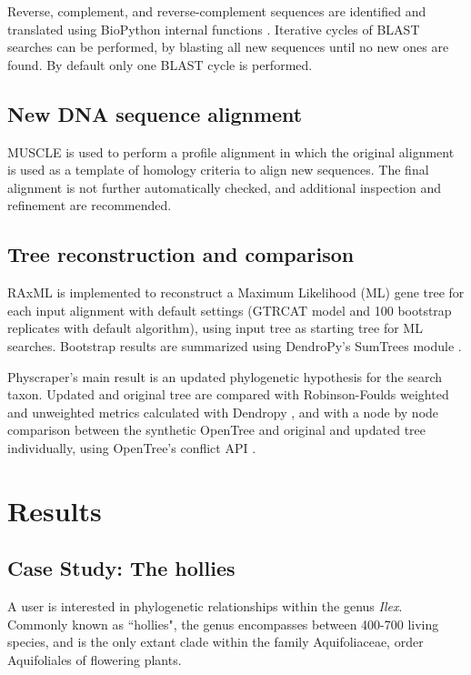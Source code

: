 \documentclass{bmcart}
\begin{document}
Reverse, complement, and reverse-complement sequences are identified and translated
using BioPython internal functions \cite{cock2009biopython}.
Iterative cycles of BLAST searches can be performed, by blasting all new sequences
until no new ones are found. By default only one BLAST cycle is performed.

\subsection*{New DNA sequence alignment}

MUSCLE \cite{edgar2004muscle} is used to perform a profile alignment in which the
original alignment is used as a template of homology criteria to align new sequences.
The final alignment is not further automatically checked, and additional inspection
and refinement are recommended.

\subsection*{Tree reconstruction and comparison}

RAxML \cite{stamatakis2014raxml} is implemented to reconstruct a Maximum Likelihood
(ML) gene tree for each input alignment with default settings (GTRCAT model and
100 bootstrap replicates with default algorithm), using input tree as starting
tree for ML searches.
Bootstrap results are summarized using DendroPy's SumTrees module
\cite{sukumaran2010dendropy}.

Physcraper's main result is an updated phylogenetic hypothesis for the search taxon.
Updated and original tree are compared with Robinson-Foulds weighted and unweighted
metrics calculated with Dendropy \cite{sukumaran2010dendropy}, and with a node by node
comparison between the synthetic OpenTree and original and updated tree individually,
using OpenTree's conflict API \cite{redelings2017supertree}.


\section*{Results}
\subsection*{Case Study: The hollies}

A user is interested in phylogenetic relationships within the genus \textit{Ilex}. Commonly
known as ``hollies", the genus encompasses between 400-700 living species, and is
the only extant clade within the family Aquifoliaceae, order Aquifoliales of flowering
plants.
\end{document}
